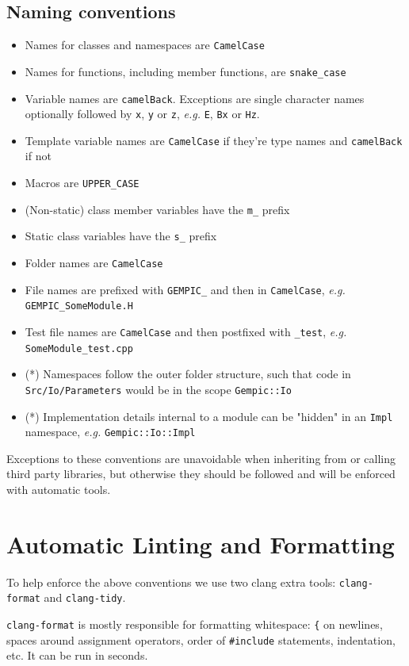 \documentclass[11pt]{article}
\begin{document}
\subsection{Naming conventions}
\begin{itemize}
    \item Names for classes and namespaces are \verb|CamelCase|
    \item Names for functions, including member functions, are \verb|snake_case|
    \item Variable names are \verb|camelBack|. Exceptions are single character names optionally followed by \lstinline{x}, \lstinline{y} or \lstinline{z}, \emph{e.g.} \verb|E|, \lstinline{Bx} or \lstinline{Hz}.
    \item Template variable names are \verb|CamelCase| if they're type names and \verb|camelBack| if not
    \item Macros are \lstinline{UPPER_CASE}
    \item (Non-static) class member variables have the \lstinline{m_} prefix
    \item Static class variables have the \lstinline{s_} prefix
    \item Folder names are \verb|CamelCase|
    \item File names are prefixed with \verb|GEMPIC_| and then in \verb|CamelCase|, \emph{e.g.} \verb|GEMPIC_SomeModule.H|
    \item Test file names are \verb|CamelCase| and then postfixed with \verb|_test|, \emph{e.g.} \verb|SomeModule_test.cpp|
    \item (*) Namespaces follow the outer folder structure, such that code in \verb|Src/Io/Parameters| would be in the scope \lstinline{Gempic::Io}
    \item (*) Implementation details internal to a module can be "hidden" in an \verb|Impl| namespace, \emph{e.g.} \verb|Gempic::Io::Impl|
\end{itemize}
Exceptions to these conventions are unavoidable when inheriting from or calling third party libraries, but otherwise they should be followed and will be enforced with automatic tools.

\section{Automatic Linting and Formatting}
To help enforce the above conventions we use two clang extra tools: \verb|clang-format| and \verb|clang-tidy|.

\verb|clang-format| is mostly responsible for formatting whitespace: \verb|{| on newlines, spaces around assignment operators, order of \lstinline{#include} statements, indentation, etc. It can be run in seconds.
\end{document}
